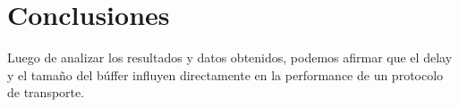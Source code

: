 \section{Conclusiones}

Luego de analizar los resultados y datos obtenidos, podemos afirmar que el delay y el tama\~no del b\'uffer influyen directamente en la performance de un protocolo de transporte. 




